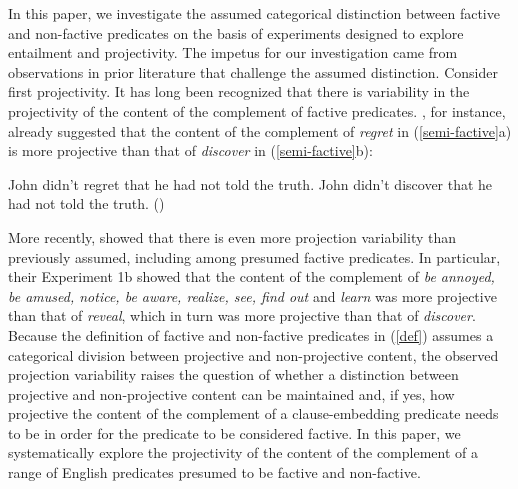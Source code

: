 \documentclass[11pt,fleqn]{article}
\newcommand{\6}{\mbox{$[\hspace*{-.6mm}[$}}
\newcommand{\9}{\mbox{$]\hspace*{-.6mm}]$}}
\begin{document}
In this paper, we investigate the assumed categorical distinction between factive and non-factive predicates on the basis of experiments designed to explore entailment and projectivity. The impetus for our investigation came from observations in prior literature that challenge the assumed distinction. Consider first projectivity. It has long been recognized that there is variability in the projectivity of the content of the complement of factive predicates. \citet{karttunen71b}, for instance, already suggested that the content of the complement of {\em regret} in (\ref{semi-factive}a) is more projective than that of {\em discover} in (\ref{semi-factive}b): 


\begin{exe}
\ex\label{semi-factive}
\begin{xlist}
\ex John didn't regret that he had not told the truth.
\ex John didn't discover that he had not told the truth.  
\hfill (\citealt[63]{karttunen71b})

\end{xlist}
\end{exe}
More recently, \citet*{tbd-variability} showed that there is even more projection variability than previously assumed, including among presumed factive predicates. In particular, their Experiment 1b showed that the content of the complement of {\em be annoyed, be amused, notice, be aware, realize, see, find out} and {\em learn} was more projective than that of {\em reveal}, which in turn was more projective than that of {\em discover}.  Because the definition of factive and non-factive predicates in (\ref{def}) assumes a categorical division between projective and non-projective content, the observed projection variability raises the question of whether a distinction between projective and non-projective content can be maintained and, if yes, how projective the content of the complement of a clause-embedding predicate needs to be in order for the predicate to be considered factive. In this paper, we systematically explore the projectivity of the content of the complement of a range of English predicates presumed to be factive and non-factive. 
\end{document}
